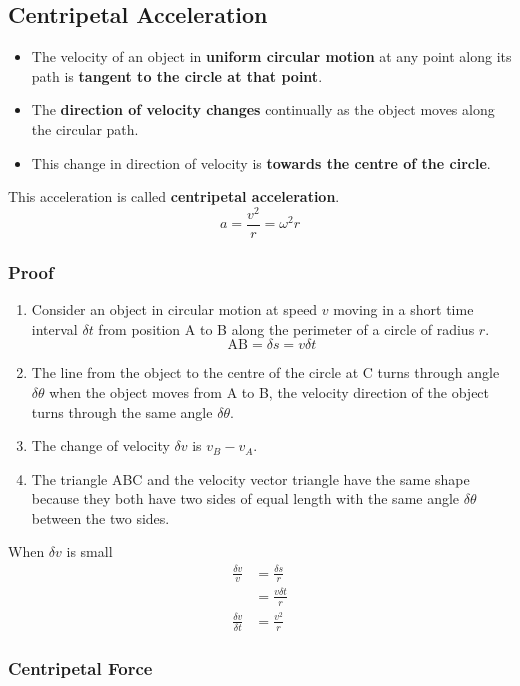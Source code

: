 \subsection{Centripetal Acceleration}

\begin{itemize}
    \item The velocity of an object in \textbf{uniform circular motion} at any point along its path is \textbf{tangent to the circle at that point}.
    \item The \textbf{direction of velocity changes} continually as the object moves along the circular path.
    \item This change in direction of velocity is \textbf{towards the centre of the circle}.
\end{itemize}

This acceleration is called \textbf{centripetal acceleration}.
$$a=\frac{v^2}{r}=\omega^2r$$

\subsubsection*{Proof}
\begin{enumerate}
    \item Consider an object in circular motion at speed $v$ moving in  a short time interval $\delta t$ from position A to B along the perimeter of a circle of radius $r$.
        $$\text{AB}=\delta s=v\delta t$$
    \item The line from the object to the centre of the circle at C turns through angle $\delta\theta$ when the object moves from A to B, the velocity direction of the object turns through the same angle $\delta\theta$.
    \item The change of velocity $\delta v$ is $v_B-v_A$.
    \item The triangle ABC and the velocity vector triangle have the same shape because they both have two sides of equal length with the same angle $\delta\theta$ between the two sides.
\end{enumerate}
When $\delta v$ is small
\begin{align*}
    \frac{\delta v}{v}&=\frac{\delta s}{r}\\
                      &=\frac{v\delta t}{r}\\
    \frac{\delta v}{\delta t}&=\frac{v^2}{r}
\end{align*}

\subsubsection*{Centripetal Force}

